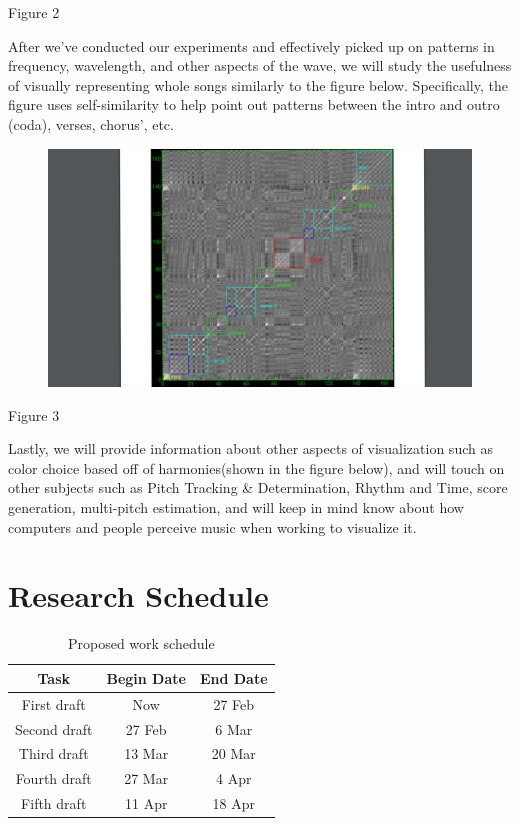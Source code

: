 \documentclass[11pt]{article}
\begin{document}
\begin{center}
Figure 2
\end{center}
After we've conducted our experiments and effectively picked up on patterns in frequency, wavelength, and other aspects of the wave, we will study the usefulness of visually representing whole songs similarly to the figure below. Specifically, the figure uses self-similarity to help point out patterns between the intro and outro (coda), verses, chorus', etc. \cite{}
\begin{figure}
\includegraphics[scale=.2]{Music1}
\end{figure}
\begin{center}
Figure 3
\end{center}
Lastly, we will provide information about other aspects of visualization such as color choice based off of harmonies(shown in the figure below), and will touch on other subjects such as Pitch Tracking & Determination, Rhythm and Time, score generation, multi-pitch estimation, and will keep in mind know about how computers and people perceive music when working to visualize it.

\vspace*{-.1in}
\section{Research Schedule}
\label{sec:schedule}
\vspace*{-.1in}

\begin{table}[htbp]
\centering
\begin{tabular}{|c||c|c|}
\hline
\bf Task & \bf Begin Date & \bf End Date\\\hline\hline
First draft & Now & 27 Feb\\\hline
Second draft & 27 Feb & 6 Mar\\\hline
Third draft & 13 Mar & 20 Mar\\\hline
Fourth draft & 27 Mar & 4 Apr\\\hline
Fifth draft & 11 Apr & 18 Apr\\\hline
\end{tabular}
\caption{Proposed work schedule}
\label{intro-tab1}
\end{table}
\end{document}
